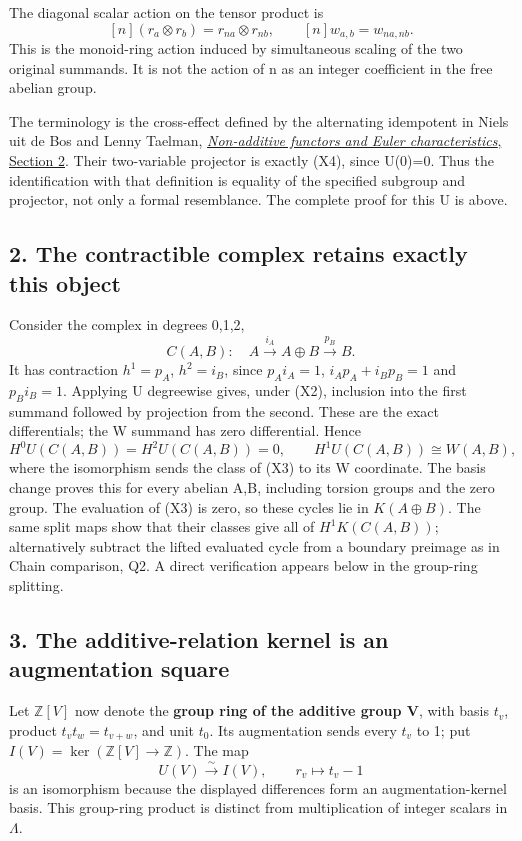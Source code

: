 \documentclass[
]{article}
\begin{document}
The diagonal scalar action on the tensor product is \[
[n](r_a\otimes r_b)=r_{na}\otimes r_{nb},\qquad
[n]w_{a,b}=w_{na,nb}.
\tag{X5}
\] This is the monoid-ring action induced by simultaneous scaling of the
two original summands. It is not the action of n as an integer
coefficient in the free abelian group.

The terminology is the cross-effect defined by the alternating
idempotent in Niels uit de Bos and Lenny Taelman,
\href{https://arxiv.org/abs/1410.6908v4}{\emph{Non-additive functors and
Euler characteristics}, Section 2}. Their two-variable projector is
exactly (X4), since U(0)=0. Thus the identification with that definition
is equality of the specified subgroup and projector, not only a formal
resemblance. The complete proof for this U is above.

\subsection{2. The contractible complex retains exactly this
object}\label{the-contractible-complex-retains-exactly-this-object}

Consider the complex in degrees 0,1,2, \[
C(A,B):\quad A\xrightarrow{i_A}A\oplus B\xrightarrow{p_B}B.
\tag{X6}
\] It has contraction \(h^1=p_A\), \(h^2=i_B\), since \(p_Ai_A=1\),
\(i_Ap_A+i_Bp_B=1\) and \(p_Bi_B=1\). Applying U degreewise gives, under
(X2), inclusion into the first summand followed by projection from the
second. These are the exact differentials; the W summand has zero
differential. Hence \[
H^0U(C(A,B))=H^2U(C(A,B))=0,
\qquad H^1U(C(A,B))\cong W(A,B),
\tag{X7}
\] where the isomorphism sends the class of (X3) to its W coordinate.
The basis change proves this for every abelian A,B, including torsion
groups and the zero group. The evaluation of (X3) is zero, so these
cycles lie in \(K(A\oplus B)\). The same split maps show that their
classes give all of \(H^1K(C(A,B))\); alternatively subtract the lifted
evaluated cycle from a boundary preimage as in Chain comparison, Q2. A
direct verification appears below in the group-ring splitting.

\subsection{3. The additive-relation kernel is an augmentation
square}\label{the-additive-relation-kernel-is-an-augmentation-square}

Let \(\mathbb Z[V]\) now denote the \textbf{group ring of the additive
group V}, with basis \(t_v\), product \(t_vt_w=t_{v+w}\), and unit
\(t_0\). Its augmentation sends every \(t_v\) to 1; put
\(I(V)=\ker(\mathbb Z[V]\to\mathbb Z)\). The map \[
U(V)\xrightarrow{\sim}I(V),\qquad r_v\longmapsto t_v-1
\tag{X8}
\] is an isomorphism because the displayed differences form an
augmentation-kernel basis. This group-ring product is distinct from
multiplication of integer scalars in \(\Lambda\).
\end{document}
